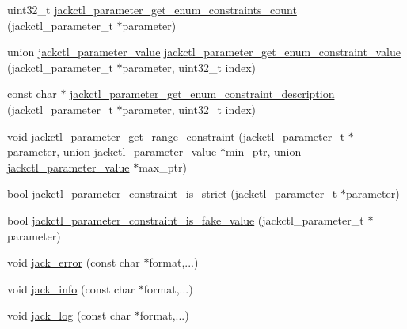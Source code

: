 \begin{DoxyCompactItemize}
\item 
uint32\-\_\-t \hyperlink{group__ServerControl_ga1578b61842cf7a7cfb0d8fe54cf286ff}{jackctl\-\_\-parameter\-\_\-get\-\_\-enum\-\_\-constraints\-\_\-count} (jackctl\-\_\-parameter\-\_\-t $\ast$parameter)
\item 
union \hyperlink{unionjackctl__parameter__value}{jackctl\-\_\-parameter\-\_\-value} \hyperlink{group__ServerControl_ga12fbe98c92f84dcfbd2de23421181567}{jackctl\-\_\-parameter\-\_\-get\-\_\-enum\-\_\-constraint\-\_\-value} (jackctl\-\_\-parameter\-\_\-t $\ast$parameter, uint32\-\_\-t index)
\item 
const char $\ast$ \hyperlink{group__ServerControl_gadbaa1566bcd829aa4233aac9234125ed}{jackctl\-\_\-parameter\-\_\-get\-\_\-enum\-\_\-constraint\-\_\-description} (jackctl\-\_\-parameter\-\_\-t $\ast$parameter, uint32\-\_\-t index)
\item 
void \hyperlink{group__ServerControl_ga132d53b3fe319e84baf5a2381bd50fc6}{jackctl\-\_\-parameter\-\_\-get\-\_\-range\-\_\-constraint} (jackctl\-\_\-parameter\-\_\-t $\ast$parameter, union \hyperlink{unionjackctl__parameter__value}{jackctl\-\_\-parameter\-\_\-value} $\ast$min\-\_\-ptr, union \hyperlink{unionjackctl__parameter__value}{jackctl\-\_\-parameter\-\_\-value} $\ast$max\-\_\-ptr)
\item 
bool \hyperlink{group__ServerControl_gac1d74fdcc7125293b7c2d329c0b09e9a}{jackctl\-\_\-parameter\-\_\-constraint\-\_\-is\-\_\-strict} (jackctl\-\_\-parameter\-\_\-t $\ast$parameter)
\item 
bool \hyperlink{group__ServerControl_gafd1b5bc48305a978135692997abc8996}{jackctl\-\_\-parameter\-\_\-constraint\-\_\-is\-\_\-fake\-\_\-value} (jackctl\-\_\-parameter\-\_\-t $\ast$parameter)
\item 
void \hyperlink{group__ServerControl_gac6448626e0b75fc6d9da1ccbdca0355e}{jack\-\_\-error} (const char $\ast$format,...)
\item 
void \hyperlink{group__ServerControl_ga21328fd378306e0da7270952196eb717}{jack\-\_\-info} (const char $\ast$format,...)
\item 
void \hyperlink{group__ServerControl_ga35f69faaee3bb9b958ed8c9a5f62246c}{jack\-\_\-log} (const char $\ast$format,...)
\end{DoxyCompactItemize}


